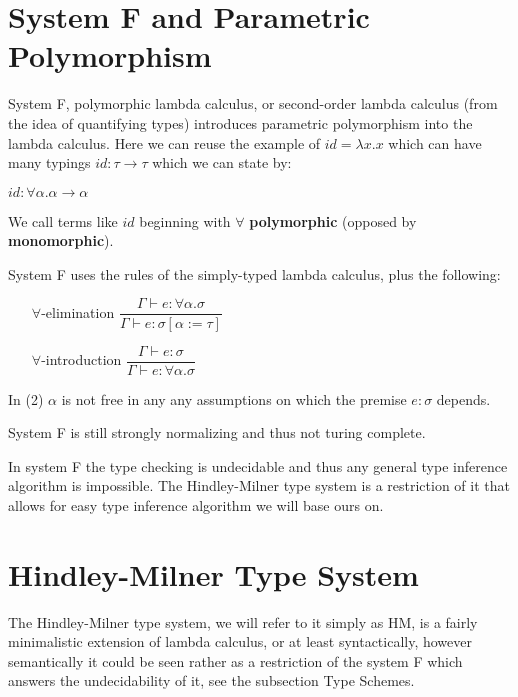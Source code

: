 \section{System F and Parametric Polymorphism} %

System F, polymorphic lambda calculus, or second-order lambda calculus (from the idea of quantifying types) introduces
parametric polymorphism into the lambda calculus. Here we can reuse the example of $id = \lambda x . x$ which can have many typings
$id : \tau \rightarrow \tau$ which we can state by:

$id : \forall \alpha . \alpha \rightarrow \alpha$

We call terms like $id$ beginning with $\forall$ \textbf{polymorphic} (opposed by \textbf{monomorphic}).

System F uses the rules of the simply-typed lambda calculus, plus the following:

\begin{itemize}
    \item[$\forall$-elimination] $\dfrac{\Gamma \vdash e : \forall \alpha . \sigma}{\Gamma \vdash e : \sigma [\alpha := \tau]}$
    \item[$\forall$-introduction] $\dfrac{\Gamma \vdash e : \sigma}{\Gamma \vdash e : \forall \alpha . \sigma}$
\end{itemize}

In (2) $\alpha$ is not free in any any assumptions on which the premise $e : \sigma$ depends. %

System F is still strongly normalizing and thus not turing complete. %

In system F the type checking is undecidable and thus any general type inference algorithm is impossible.
The Hindley-Milner type system is a restriction of it %
that allows for easy type inference algorithm we will base ours on.

\section{Hindley-Milner Type System}

The Hindley-Milner type system, we will refer to it simply as HM, is a fairly minimalistic extension of lambda calculus, or at least syntactically, however semantically it could be seen rather as a restriction of the system F which answers the undecidability of it, see the subsection Type Schemes. %

